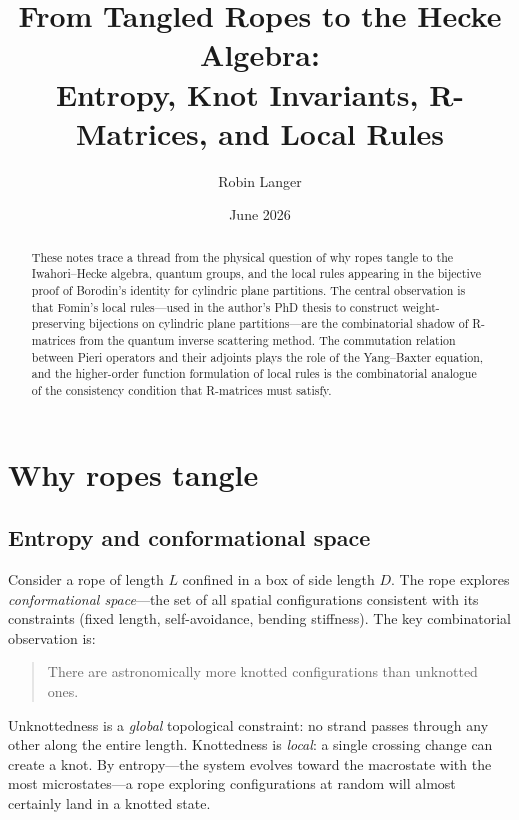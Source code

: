 \documentclass[12pt]{article}
\title{From Tangled Ropes to the Hecke Algebra:\\
  Entropy, Knot Invariants, R-Matrices, and Local Rules}
\author{Robin Langer}
\date{June 2026}
\begin{document}
\maketitle

\begin{abstract}
These notes trace a thread from the physical question of why ropes tangle
to the Iwahori--Hecke algebra, quantum groups, and the local rules appearing
in the bijective proof of Borodin's identity for cylindric plane partitions.
The central observation is that Fomin's local rules---used in the author's
PhD thesis to construct weight-preserving bijections on cylindric plane
partitions---are the combinatorial shadow of R-matrices from the quantum
inverse scattering method. The commutation relation between Pieri operators
and their adjoints plays the role of the Yang--Baxter equation, and the
higher-order function formulation of local rules is the combinatorial
analogue of the consistency condition that R-matrices must satisfy.
\end{abstract}

\tableofcontents

\section{Why ropes tangle}

\subsection{Entropy and conformational space}

Consider a rope of length $L$ confined in a box of side length $D$.
The rope explores \emph{conformational space}---the set of all spatial
configurations consistent with its constraints (fixed length, self-avoidance,
bending stiffness). The key combinatorial observation is:

\begin{quote}
There are astronomically more knotted configurations than unknotted ones.
\end{quote}

Unknottedness is a \emph{global} topological constraint: no strand passes
through any other along the entire length. Knottedness is \emph{local}:
a single crossing change can create a knot. By entropy---the system evolves
toward the macrostate with the most microstates---a rope exploring
configurations at random will almost certainly land in a knotted state.
\end{document}
